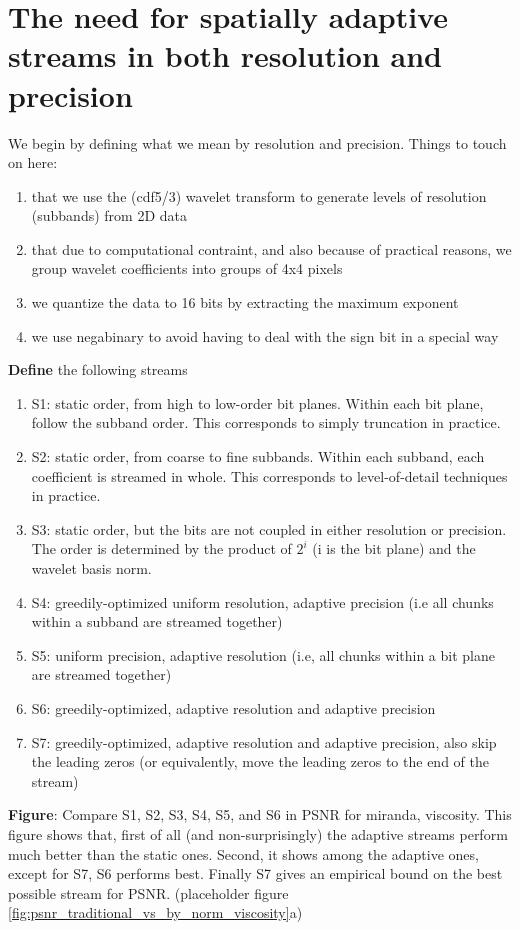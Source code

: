 \section{The need for spatially adaptive streams in both resolution and precision}
We begin by defining what we mean by resolution and precision. Things to touch on here:
\begin{enumerate}
  \item that we use the (cdf5/3) wavelet transform to generate levels of resolution (subbands) from 2D data
  \item that due to computational contraint, and also because of practical reasons, we group wavelet coefficients into groups of 4x4 pixels
  \item we quantize the data to 16 bits by extracting the maximum exponent
  \item we use negabinary to avoid having to deal with the sign bit in a special way
\end{enumerate}

\textbf{Define} the following streams
\begin{enumerate}
  \item S1: static order, from high to low-order bit planes. Within each bit plane, follow the subband order. This corresponds to simply truncation in practice.
  \item S2: static order, from coarse to fine subbands. Within each subband, each coefficient is streamed in whole. This corresponds to level-of-detail techniques in practice.
  \item S3: static order, but the bits are not coupled in either resolution or precision. The order is determined by the product of $2^i$ (i is the bit plane) and the wavelet basis norm.
  \item S4: greedily-optimized uniform resolution, adaptive precision (i.e all chunks within a subband are streamed together)
  \item S5: uniform precision, adaptive resolution (i.e, all chunks within a bit plane are streamed together)
  \item S6: greedily-optimized, adaptive resolution and adaptive precision 
  \item S7: greedily-optimized, adaptive resolution and adaptive precision, also skip the leading zeros (or equivalently, move the leading zeros to the end of the stream)
\end{enumerate}

\textbf{Figure}: Compare S1, S2, S3, S4, S5, and S6 in PSNR for miranda, viscosity. This figure shows that, first of all (and non-surprisingly) the adaptive streams perform much better than the static ones. Second, it shows among the adaptive ones, except for S7, S6 performs best. Finally S7 gives an empirical bound on the best possible stream for PSNR. (placeholder figure \ref{fig:psnr_traditional_vs_by_norm_viscosity}a)

